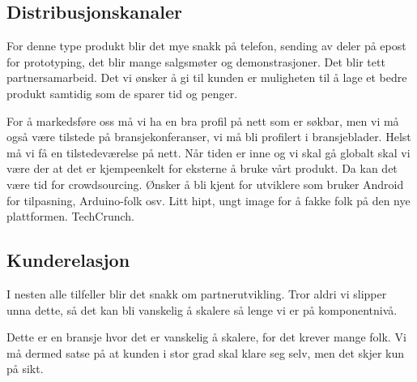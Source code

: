



\subsection{Distribusjonskanaler}

For denne type produkt blir det mye snakk på telefon, sending av deler på epost
for prototyping, det blir mange salgsmøter og demonstrasjoner. Det blir tett
partnersamarbeid. Det vi ønsker å gi til kunden er muligheten til å lage et
bedre produkt samtidig som de sparer tid og penger.

For å markedsføre oss må vi ha en bra profil på nett som er søkbar, men vi må
også være tilstede på bransjekonferanser, vi må bli profilert i bransjeblader.
Helst må vi få en tilstedeværelse på nett. Når tiden er inne og vi skal gå
globalt skal vi være der at det er kjempeenkelt for eksterne å bruke vårt
produkt. Da kan det være tid for crowdsourcing. Ønsker å bli kjent for
utviklere som bruker Android for tilpasning, Arduino-folk osv. Litt hipt, ungt
image for å fakke folk på den nye plattformen. TechCrunch.

\subsection{Kunderelasjon}

I nesten alle tilfeller blir det snakk om partnerutvikling. Tror aldri vi
slipper unna dette, så det kan bli vanskelig å skalere så lenge vi er på
komponentnivå.

Dette er en bransje hvor det er vanskelig å skalere, for det krever mange folk.
Vi må dermed satse på at kunden i stor grad skal klare seg selv, men det skjer
kun på sikt.

